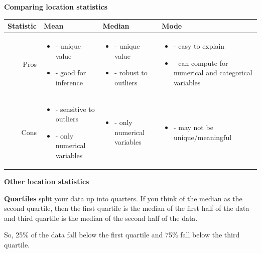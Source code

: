 \documentclass[ignorenonframetext,]{beamer}
\begin{document}
\begin{frame}{}
\protect\hypertarget{section-37}{}

\textbf{\large Comparing location statistics}

\vspace{2ex}
\scriptsize
\begin{tabular}{|r|p{}|p{}|p{}|}
\hline
Statistic & Mean & Median & Mode\\
\hline
Pros & 
\begin{itemize}[leftmargin=*]\item[]  - unique value
\item[] - good for inference\end{itemize} & 
\begin{itemize}[leftmargin=*]\item[] - unique value
\item[] - robust to outliers \end{itemize} & 
\begin{itemize}[leftmargin=*]\item[]  - easy to explain 
\item[] - can compute for numerical and categorical variables\end{itemize}\\\hline
Cons & 
\begin{itemize}[leftmargin=*]\item[]  - sensitive to outliers \item - only numerical variables
\end{itemize} & 
\begin{itemize}[leftmargin=*]\item - only numerical variables\end{itemize} & 
\begin{itemize}[leftmargin=*]\item[]  - may not be unique/meaningful\end{itemize}\\\hline
\end{tabular}

\end{frame}

\begin{frame}{}
\protect\hypertarget{section-38}{}

\textbf{\large Other location statistics}

\textbf{Quartiles} split your data up into quarters. If you think of the
median as the second quartile, then the first quartile is the median of
the first half of the data and third quartile is the median of the
second half of the data.

\vspace{2ex}

So, 25\% of the data fall below the first quartile and 75\% fall below
the third quartile.

\end{frame}
\end{document}
